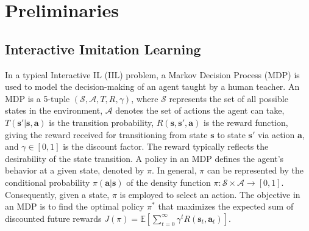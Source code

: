 \section{Preliminaries}
\label{sec:Preliminaries}

\subsection{Interactive Imitation Learning}
\label{sec:Preliminaries:IIL}

In a typical Interactive IL (IIL) problem, a Markov Decision Process (MDP) is used to model the decision-making of an agent taught by a human teacher. 
An MDP is a 5-tuple \((\mathcal  S, \mathcal A, T, R, \gamma)\), where \(\mathcal  S\) represents the set of all possible states in the environment, \(\mathcal  A\) denotes the set of actions the agent can take, \(T(\bm s' |\bm s, \bm a)\) is the transition probability, \(R(\bm s, \bm s', \bm a)\) is the reward function, giving the reward received for transitioning from state \(\bm s\) to state \(\bm s'\) via action \(\bm a\), and \(\gamma \in [0, 1]\) is the discount factor.
The reward typically reflects the desirability of the state transition.
A policy in an MDP defines the agent's behavior at a given state, denoted by \(\pi\).
In general, $\pi$ can be represented by the conditional probability $\pi(\bm a|\bm s)$ of the density function \(\pi: \mathcal S \times \mathcal A \rightarrow [0, 1]\). Consequently, given a state, $\pi$ is employed to select an action. The objective in an MDP is to find the optimal policy \(\pi^*\) that maximizes the expected sum of discounted future rewards $J(\pi) = \mathbb{E} \left[ \sum_{t=0}^\infty \gamma^{t} R(\bm s_t, \bm a_t) \right]$. 

